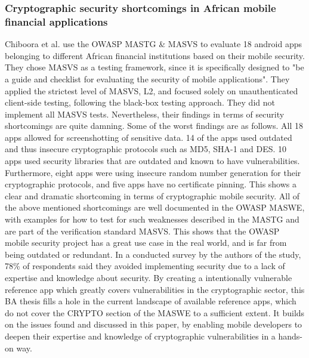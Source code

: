 \subsubsection{Cryptographic security shortcomings in African mobile financial applications}
Chiboora et al. \citep{paper_07} use the OWASP MASTG \& MASVS to evaluate 18 android apps belonging to different African financial institutions based on their mobile security. They chose MASVS as a testing framework, since it is specifically designed to "be a guide and checklist for evaluating the security of mobile applications". They applied the strictest level of MASVS, L2, and focused solely on unauthenticated client-side testing, following the black-box testing approach. They did not implement all MASVS tests. Nevertheless, their findings in terms of security shortcomings are quite damning. Some of the worst findings are as follows. All 18 apps allowed for screenshotting of sensitive data. 14 of the apps used outdated and thus insecure cryptographic protocols such as MD5, SHA-1 and DES. 10 apps used security libraries that are outdated and known to have vulnerabilities. Furthermore, eight apps were using insecure random number generation for their cryptographic protocols, and five apps have no certificate pinning. This shows a clear and dramatic shortcoming in terms of cryptographic mobile security. All of the above mentioned shortcomings are well documented in the OWASP MASWE, with examples for how to test for such weaknesses described in the MASTG and are part of the verification standard MASVS. This shows that the OWASP mobile security project has a great use case in the real world, and is far from being outdated or redundant. In a  conducted survey by the authors of the study, 78\% of respondents said they avoided implementing security due to a lack of expertise and knowledge about security. By creating a intentionally vulnerable reference app which greatly covers vulnerabilities in the cryptographic sector, this BA thesis fills a hole in the current landscape of available reference apps, which do not cover the CRYPTO section of the MASWE to a sufficient extent. It builds on the issues found and discussed in this paper, by enabling mobile developers to deepen their expertise and knowledge of cryptographic vulnerabilities in a hands-on way.

